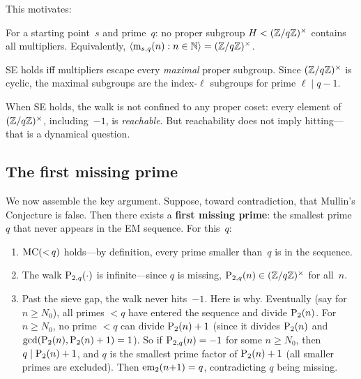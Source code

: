 \noindent This motivates:

\begin{property}\label{def:se}
For a starting point~$s$ and prime~$q$: no proper subgroup
$H < (\mathbb{Z}/q\mathbb{Z})^\times$ contains all multipliers.  Equivalently,
$\langle \mathrm{m}_{s,q}(n) : n \in \mathbb{N} \rangle = (\mathbb{Z}/q\mathbb{Z})^\times$.
\end{property}

\begin{theorem}
SE holds iff multipliers escape every \emph{maximal} proper subgroup.
Since $(\mathbb{Z}/q\mathbb{Z})^\times$ is cyclic, the maximal subgroups are the
index-$\ell$ subgroups for prime $\ell \mid q\!-\!1$.
\end{theorem}

\noindent When SE holds, the walk is not confined to any proper coset: every
element of $(\mathbb{Z}/q\mathbb{Z})^\times$, including~$-1$, is \emph{reachable}.
But reachability does not imply hitting---that is a dynamical question.

\subsection{The first missing prime}

We now assemble the key argument.  Suppose, toward contradiction, that
Mullin's Conjecture is false.  Then there exists a \textbf{first
missing prime}: the smallest prime~$q$ that never appears in the EM
sequence. For this~$q$:

\begin{enumerate}[label=(\alph*),nosep]
\item $\mathrm{MC}({<}\,q)$ holds---by definition, every prime smaller than~$q$
  is in the sequence.
\item The walk $\mathrm{P}_{2,q}(\cdot)$ is infinite---since $q$ is missing,
  $\mathrm{P}_{2,q}(n) \in (\mathbb{Z}/q\mathbb{Z})^\times$ for all~$n$.
\item Past the sieve gap, the walk never hits~$-1$.  Here is why.
  Eventually (say for $n \geq N_0$), all primes $< q$ have entered
  the sequence and divide $\mathrm{P}_{2}(n)$.  For $n \geq N_0$, no prime
  $< q$ can divide $\mathrm{P}_{2}(n)+1$ (since it divides $\mathrm{P}_{2}(n)$ and
  $\gcd(\mathrm{P}_{2}(n), \mathrm{P}_{2}(n)+1) = 1$).  So if $\mathrm{P}_{2,q}(n) = -1$ for
  some $n \geq N_0$, then $q \mid \mathrm{P}_{2}(n)+1$, and $q$ is the smallest
  prime factor of $\mathrm{P}_{2}(n)+1$ (all smaller primes are excluded).
  Then $\mathrm{em}_{2}(n{+}1) = q$, contradicting $q$ being missing.
\end{enumerate}

